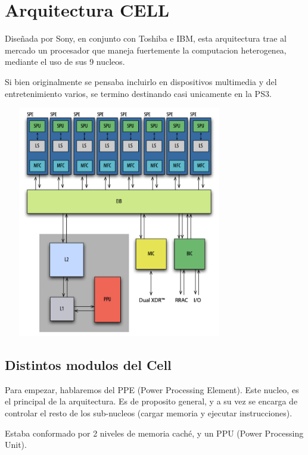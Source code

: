 \documentclass[11pt,compsoc]{IEEEtran}
\begin{document}
	
	\section{Arquitectura CELL}	%
	\noindent Diseñada por Sony, en conjunto con Toshiba e IBM, esta arquitectura trae al mercado un procesador que maneja fuertemente la computacion heterogenea, mediante el uso de sus 9 nucleos. 
	
	Si bien originalmente se pensaba incluirlo en dispositivos multimedia y del entretenimiento varios, se termino destinando casi unicamente en la PS3.\newline
	
	\begin{center}
		{\includegraphics[width=4in,height=4in,clip,keepaspectratio]{imgs/arquitecturacell.png}}\newline
	\end{center}
	
	
	\subsection{Distintos modulos del Cell} 
	\noindent Para empezar, hablaremos del PPE (Power Processing Element). Este nucleo, es el principal de la arquitectura. Es de proposito general, y a su vez se encarga de controlar el resto de los sub-nucleos (cargar memoria y ejecutar instrucciones).
	
	Estaba conformado por 2 niveles de memoria caché, y un PPU (Power Processing Unit).\newline
	
\end{document}
